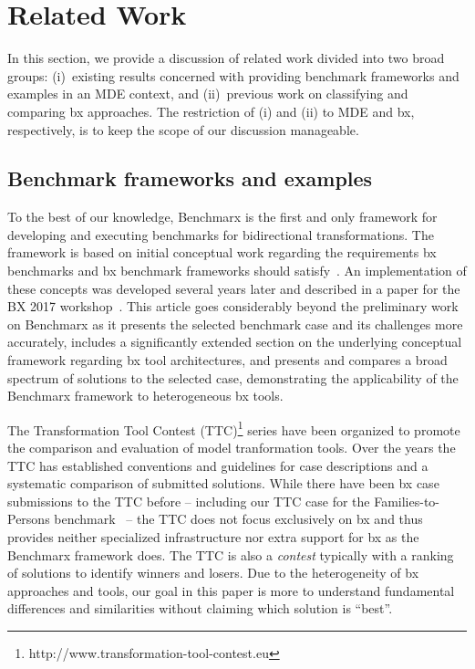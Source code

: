 \section{Related Work}
\label{sec:RelatedWork}

In this section, we provide a discussion of related work divided into two broad groups:  (i)~existing results concerned with providing benchmark frameworks and examples in an MDE context, and (ii)~previous work on classifying and comparing bx approaches.
The restriction of (i) and (ii) to MDE and bx, respectively, is to keep the scope of our discussion manageable.

\subsection{Benchmark frameworks and examples}
\label{sec:BenchmarkFrameworks}

To the best of our knowledge, Benchmarx is the first and only framework for developing and executing benchmarks for bidirectional transformations.
The framework is based on initial conceptual work regarding the requirements bx benchmarks and bx benchmark frameworks should satisfy~\cite{AnjorinCG0RS14}.
An implementation of these concepts was developed several years later and described in a paper for the BX 2017 workshop~\cite{Anjorin2017}.
This article goes considerably beyond the preliminary work on Benchmarx as it presents the selected benchmark case and its challenges more accurately, includes a significantly extended section on the underlying conceptual framework regarding bx tool architectures, and presents and compares a broad spectrum of solutions to the selected case, demonstrating the applicability of the Benchmarx framework to heterogeneous bx tools. 

The Transformation Tool Contest (TTC)\footnote{http://www.transformation-tool-contest.eu} series have been organized to promote the comparison and evaluation of model tranformation tools.
Over the years the TTC has established conventions and guidelines for case descriptions and a systematic comparison of submitted solutions.
While there have been bx case submissions to the TTC before -- including our TTC case for the Families-to-Persons benchmark~\cite{Anjorin2017a} -- the TTC does not focus exclusively on bx and thus provides neither specialized infrastructure nor extra support for bx as the Benchmarx framework does.
The TTC is also a \emph{contest} typically with a ranking of solutions to identify winners and losers.
Due to the heterogeneity of bx approaches and tools, our goal in this paper is more to understand fundamental differences and similarities without claiming which solution is ``best''.


